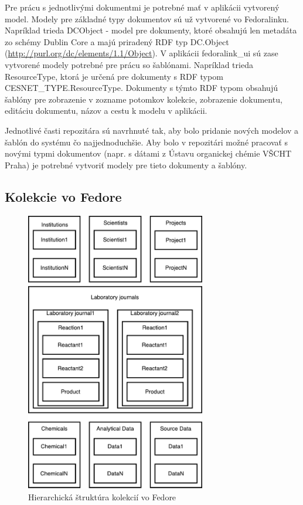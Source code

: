 \documentclass[thesis=M,slovak]{FITthesis}[2013/05/06]
\begin{document}
Pre prácu s jednotlivými dokumentmi je potrebné mať v aplikácii vytvorený model. Modely pre základné typy dokumentov sú už vytvorené vo Fedoralinku. Napríklad trieda DCObject - model pre dokumenty, ktoré obsahujú len metadáta zo schémy Dublin Core a majú priradený RDF typ DC.Object (\url{http://purl.org/dc/elements/1.1/Object}). V aplikácii fedoralink\_ui sú zase vytvorené modely potrebné pre prácu so šablónami. Napríklad trieda ResourceType, ktorá je určená pre dokumenty s RDF typom CESNET\_TYPE.ResourceType. Dokumenty s týmto RDF typom obsahujú šablóny pre zobrazenie v zozname potomkov kolekcie, zobrazenie dokumentu, editáciu dokumentu, názov a cestu k modelu v aplikácii.

Jednotlivé časti repozitára sú navrhnuté tak, aby bolo pridanie nových modelov a šablón do systému čo najjednoduchšie. Aby bolo v repozitári možné pracovať s novými typmi dokumentov (napr. s dátami z Ústavu organickej chémie VŠCHT Praha) je potrebné vytvoriť modely pre tieto dokumenty a šablóny.

\subsection{Kolekcie vo Fedore}

\begin{figure}[h]\centering
	\includegraphics[width=0.7\textwidth]{diagramy/Collections_Diagram.pdf}
 	\caption[Hierarchická štruktúra kolekcií vo Fedore]{Hierarchická štruktúra kolekcií vo Fedore}\label{graphics:CollectionsDiagram}
\end{figure}
\end{document}
